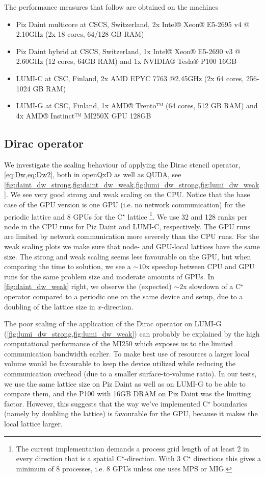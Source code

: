 The performance measures that follow are obtained on the machines
\begin{itemize}
    \item Piz Daint multicore at CSCS, Switzerland, 2x Intel® Xeon® E5-2695 v4 @ 2.10GHz (2x 18 cores, 64/128 GB RAM)
    \item Piz Daint hybrid at CSCS, Switzerland, 1x Intel® Xeon® E5-2690 v3 @ 2.60GHz (12 cores, 64GB RAM) and 1x NVIDIA® Tesla® P100 16GB
    \item LUMI-C at CSC, Finland, 2x AMD EPYC 7763 @2.45GHz (2x 64 cores, 256-1024 GB RAM)
    \item LUMI-G at CSC, Finland, 1x AMD® Trento™ (64 cores, 512 GB RAM) and 4x AMD® Instinct™ MI250X GPU 128GB
\end{itemize}

\subsection{Dirac operator}

We investigate the scaling behaviour of applying the Dirac stencil operator, \cref{eq:Dw,eq:Dw2}, both in openQxD as well as  QUDA, see \cref{fig:daint_dw_strong,fig:daint_dw_weak,fig:lumi_dw_strong,fig:lumi_dw_weak}. We see very good strong and weak scaling on the CPU. Notice that the base case of the GPU version is one GPU (i.e. no network communication) for the periodic lattice and 8 GPUs for the C$^\star$ lattice \footnote{The current implementation demands a process grid length of at least 2 in every direction that is a spatial C$^\star$-direction. With 3 C$^\star$ directions this gives a minimum of 8 processes, i.e. 8 GPUs unless one uses MPS or MIG.}. We use 32 and 128 ranks per node in the CPU runs for Piz Daint and LUMI-C, respectively. The GPU runs are limited by network communication more severely than the CPU runs. For the weak scaling plots we make sure that node- and GPU-local lattices have the same size. The strong and weak scaling seems less favourable on the GPU, but when comparing the time to solution, we see a $\sim10$x speedup between CPU and GPU runs for the same problem size and moderate amounts of GPUs. In \cref{fig:daint_dw_weak} right, we observe the (expected) $\sim2$x slowdown of a C$^\star$ operator compared to a periodic one on the same device and setup, due to a doubling of the lattice size in $x$-direction.

The poor scaling of the application of the Dirac operator on LUMI-G (\cref{fig:lumi_dw_strong,fig:lumi_dw_weak}) can probably be explained by the high computational performance of the MI250 which exposes us to the limited communication bandwidth earlier. To make best use of resources a larger local volume would be favourable to keep the device utilized while reducing the communication overhead (due to a smaller surface-to-volume ratio). In our tests, we use the same lattice size on Piz Daint as well as on LUMI-G to be able to compare them, and the P100 with 16GB DRAM on Piz Daint was the limiting factor. However, this suggests that the way we've implemented C$^\star$ boundaries (namely by doubling the lattice) is favourable for the GPU, because it makes the local lattice larger.

